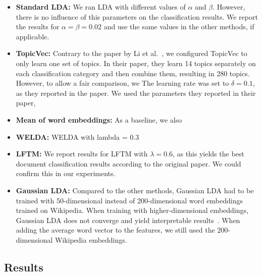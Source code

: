 \documentclass[
        a4paper,
        titlepage,
        twoside,
        parskip,
        numbers=noenddot
        ]{scrbook}
\theoremstyle{break}
\begin{document}
\begin{itemize}
  \item
    \textbf{Standard LDA:}
    We ran LDA with different values of $\alpha$ and $\beta$.
    However, there is no influence of this parameters on the classification results.
    We report the results for $\alpha = \beta = 0.02$ and use the same values in the other methods, if applicable.
  \item
    \textbf{TopicVec:}
    Contrary to the paper by Li et al.~\cite{Li2016}, we configured TopicVec to only learn one set of topics.
    In their paper, they learn 14 topics separately on each classification category and then combine them, resulting in 280 topics.
    However, to allow a fair comparison, we 
    The learning rate was set to $\delta = 0.1$, as they reported in the paper.
    We used the parameters they reported in their paper, 
  \item
    \textbf{Mean of word embeddings:}
    As a baseline, we also 
  \item
    \textbf{WELDA:}
    WELDA with lambda = 0.3
  \item
    \textbf{LFTM:}
    We report results for LFTM with $\lambda = 0.6$, as this yields the best document classification results according to the original paper.
    We could confirm this in our experiments.
  \item
    \textbf{Gaussian LDA:}
    Compared to the other methods, Gaussian LDA had to be trained with 50-dimensional instead of 200-dimensional word embeddings trained on Wikipedia.
    When training with higher-dimensional embeddings, Gaussian LDA does not converge and yield interpretable results~\cite{Das2016}.
    When adding the average word vector to the features, we still used the 200-dimensional Wikipedia embeddings.
\end{itemize}


\subsection{Results}
\end{document}
